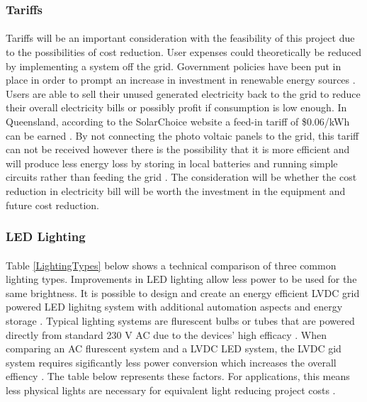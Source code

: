 \subsubsection{Tariffs}

\paragraph{}
Tariffs will be an important consideration with the feasibility of this project due to the
possibilities of cost reduction. User expenses could theoretically be reduced by implementing a system off the grid. Government policies have been put in place in order
to prompt an increase in investment in renewable energy sources \cite{Nelson2011}. Users are able to sell their unused generated electricity back to the grid to reduce their overall electricity
bills or possibly profit if consumption is low enough. In Queensland, according to the
SolarChoice website a feed-in tariff of \$0.06/kWh can be earned \cite{website:SolarChoice}. By not connecting the photo voltaic panels to the grid, this tariff can not be received however there is the possibility that it is more efficient and will produce less energy loss by storing in local
batteries and running simple circuits rather than feeding the grid \cite{AntoniouATzimasARowland2015}. The consideration will be whether the cost reduction in electricity bill will be worth the investment in the equipment and future cost reduction.   

\subsubsection{LED Lighting}

\paragraph{}
Table \ref{LightingTypes} below shows a technical comparison of three common lighting types. Improvements in LED lighting allow less power to be used for the same brightness. It is possible to design and create an energy efficient LVDC grid powered LED lighitng system with additional automation aspects and energy storage \cite{Koh2011}. Typical lighting systems are flurescent bulbs or tubes that are powered directly from standard 230 V AC due to the devices' high efficacy \cite{Koh2011}. When comparing an AC flurescent system and a LVDC LED system, the LVDC gid system requires sigificantly less power conversion which increases the overall effiency \cite{Koh2011}. The table below represents these factors. For applications, this means less physical lights are necessary for equivalent light reducing project costs \cite{website:LED}.  

